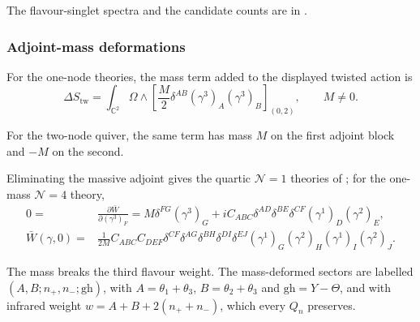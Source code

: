\documentclass[11pt]{article}
\numberwithin{equation}{section}
\numberwithin{figure}{section}
\numberwithin{table}{section}
\begin{document}
The flavour-singlet spectra and the candidate counts are in \cite[supplement, Section S7.1]{Repo}.

\subsubsection{Adjoint-mass deformations}\label{sec-results-masses}

For the one-node theories, the mass term added to the displayed twisted action is \cite[results report, \S5.1]{Repo}
\begin{equation}\label{local-ch9-mass-action}
\Delta S_{\mathrm{tw}}
=\int_{\mathbb C^2}\Omega\wedge
\left[\frac M2\delta^{AB}(\gamma^3)_A(\gamma^3)_B\right]_{(0,2)},
\qquad M\ne0.
\end{equation}

For the two-node quiver, the same term has mass $M$ on the first adjoint block and $-M$ on the second.

Eliminating the massive adjoint gives the quartic $\mathcal N=1$ theories of \cite[supplement, Section S7.2]{Repo}; for the one-mass $\mathcal N=4$ theory,
\begin{equation}\label{local-ch9-mass-ir-potential}
\begin{aligned}
0={}&\frac{\partial\bar W}{\partial(\gamma^3)_F}
=M\delta^{FG}(\gamma^3)_G
+iC_{ABC}\delta^{AD}\delta^{BE}\delta^{CF}
(\gamma^1)_D(\gamma^2)_E,\\
\bar W(\gamma,0)={}&\frac1{2M}
C_{ABC}C_{DEF}\delta^{CF}\delta^{AG}\delta^{BH}\delta^{DI}\delta^{EJ}
(\gamma^1)_G(\gamma^2)_H(\gamma^1)_I(\gamma^2)_J.
\end{aligned}
\end{equation}

The mass breaks the third flavour weight. The mass-deformed sectors are labelled $(A,B;n_+,n_-;\mathrm{gh})$, with $A=\theta_1+\theta_3$, $B=\theta_2+\theta_3$ and $\mathrm{gh}=Y-\Theta$, and with infrared weight $w=A+B+2(n_++n_-)$, which every $Q_n$ preserves.
\end{document}
